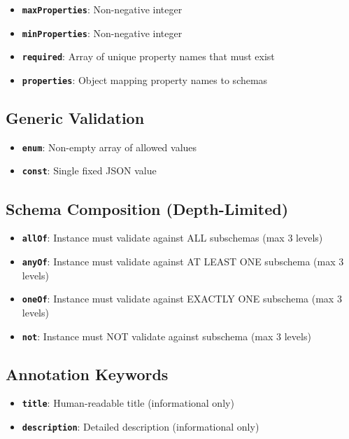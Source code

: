 \begin{itemize}
  \item \textbf{\texttt{maxProperties}}: Non-negative integer
  \item \textbf{\texttt{minProperties}}: Non-negative integer
  \item \textbf{\texttt{required}}: Array of unique property names that must exist
  \item \textbf{\texttt{properties}}: Object mapping property names to schemas
\end{itemize}

\subsection{Generic Validation}

\begin{itemize}
  \item \textbf{\texttt{enum}}: Non-empty array of allowed values
  \item \textbf{\texttt{const}}: Single fixed JSON value
\end{itemize}

\subsection{Schema Composition (Depth-Limited)}

\begin{itemize}
  \item \textbf{\texttt{allOf}}: Instance must validate against ALL subschemas (max 3 levels)
  \item \textbf{\texttt{anyOf}}: Instance must validate against AT LEAST ONE subschema (max 3 levels)
  \item \textbf{\texttt{oneOf}}: Instance must validate against EXACTLY ONE subschema (max 3 levels)
  \item \textbf{\texttt{not}}: Instance must NOT validate against subschema (max 3 levels)
\end{itemize}

\subsection{Annotation Keywords}

\begin{itemize}
  \item \textbf{\texttt{title}}: Human-readable title (informational only)
  \item \textbf{\texttt{description}}: Detailed description (informational only)
\end{itemize}

